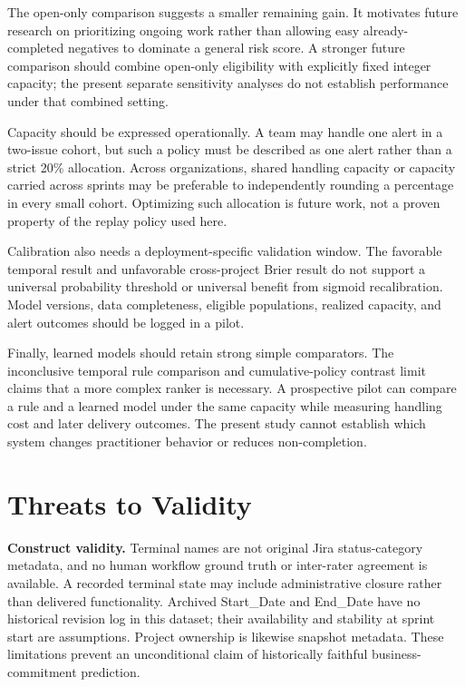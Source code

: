 \documentclass[11pt,a4paper]{article}
\begin{document}
The open-only comparison suggests a smaller remaining gain. It motivates future research on prioritizing ongoing work rather than allowing easy already-completed negatives to dominate a general risk score. A stronger future comparison should combine open-only eligibility with explicitly fixed integer capacity; the present separate sensitivity analyses do not establish performance under that combined setting.

Capacity should be expressed operationally. A team may handle one alert in a two-issue cohort, but such a policy must be described as one alert rather than a strict 20\% allocation. Across organizations, shared handling capacity or capacity carried across sprints may be preferable to independently rounding a percentage in every small cohort. Optimizing such allocation is future work, not a proven property of the replay policy used here.

Calibration also needs a deployment-specific validation window. The favorable temporal result and unfavorable cross-project Brier result do not support a universal probability threshold or universal benefit from sigmoid recalibration. Model versions, data completeness, eligible populations, realized capacity, and alert outcomes should be logged in a pilot.

Finally, learned models should retain strong simple comparators. The inconclusive temporal rule comparison and cumulative-policy contrast limit claims that a more complex ranker is necessary. A prospective pilot can compare a rule and a learned model under the same capacity while measuring handling cost and later delivery outcomes. The present study cannot establish which system changes practitioner behavior or reduces non-completion.

\section{Threats to Validity}\label{threats-to-validity}

\textbf{Construct validity.} Terminal names are not original Jira status-category metadata, and no human workflow ground truth or inter-rater agreement is available. A recorded terminal state may include administrative closure rather than delivered functionality. Archived Start\_Date and End\_Date have no historical revision log in this dataset; their availability and stability at sprint start are assumptions. Project ownership is likewise snapshot metadata. These limitations prevent an unconditional claim of historically faithful business-commitment prediction.
\end{document}
